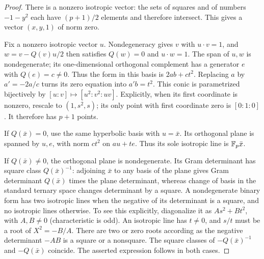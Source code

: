 \begin{proof}
There is a nonzero isotropic vector: the sets of squares and of numbers
$-1-y^2$ each have $(p+1)/2$ elements and therefore intersect. This gives
a vector $(x,y,1)$ of norm zero.

Fix a nonzero isotropic vector $u$. Nondegeneracy gives $v$ with
$u\cdot v=1$, and $w=v-Q(v)u/2$ then satisfies
$Q(w)=0$ and $u\cdot w=1$. The span of $u,w$ is nondegenerate;
its one-dimensional orthogonal complement has a generator $e$ with
$Q(e)=c\ne0$. Thus the form in this basis is $2ab+ct^2$.
Replacing $a$ by $a'=-2a/c$ turns its zero equation into $a'b=t^2$.
This conic is parametrized bijectively by
$[u:v]\mapsto[u^2:v^2:uv]$. Explicitly, when its first coordinate
is nonzero, rescale to $(1,s^2,s)$; its only point with first
coordinate zero is $[0:1:0]$. It therefore has $p+1$ points.

If $Q(\bar x)=0$, use the same hyperbolic basis with $u=\bar x$.
Its orthogonal plane is spanned by $u,e$, with norm $ct^2$ on
$au+te$. Thus its sole isotropic line is $\mathbb F_p\bar x$.

If $Q(\bar x)\ne0$, the orthogonal plane is nondegenerate. Its Gram
determinant has square class $Q(\bar x)^{-1}$: adjoining $\bar x$ to
any basis of the plane gives Gram determinant $Q(\bar x)$ times the
plane determinant, whereas change of basis in the standard ternary
space changes determinant by a square. A nondegenerate binary form
has two isotropic lines when the negative of its determinant is a
square, and no isotropic lines otherwise. To see this explicitly,
diagonalize it as $As^2+Bt^2$, with $A,B\ne0$ (characteristic is
odd). An isotropic line has $t\ne0$, and $s/t$ must be a root of
$X^2=-B/A$. There are two or zero roots according as the negative
determinant $-AB$ is a square or a nonsquare. The square classes of
$-Q(\bar x)^{-1}$ and $-Q(\bar x)$ coincide. The asserted expression
follows in both cases.
\end{proof}

